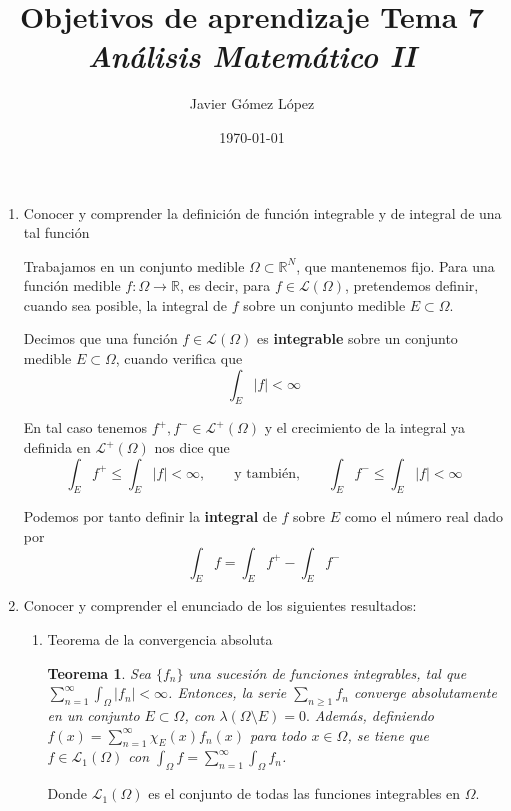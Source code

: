 \documentclass[a4paper, 12pt]{article}
\title{\textbf{Objetivos de aprendizaje Tema 7} \\ \textit{Análisis Matemático II}}
\author{Javier Gómez López}
\date{\today}
\newtheorem{teorema}{Teorema}
\begin{document}
\maketitle

\begin{enumerate}[label=\textbf{\arabic*}.]

\item Conocer y comprender la definición de función integrable y de integral de una tal función
	
Trabajamos en un conjunto medible \(\Omega \subset \mathbb{R}^N\), que mantenemos fijo. Para una función medible \(f: \Omega \to \mathbb{R}\), es decir, para \(f \in \mathcal{L} (\Omega)\), pretendemos definir, cuando sea posible, la integral de \(f\) sobre un conjunto medible \(E \subset \Omega\).

Decimos que una función \(f \in \mathcal{L} (\Omega)\) es \textbf{integrable} sobre un conjunto medible \(E \subset \Omega\), cuando verifica que
\[
	\int_E |f| < \infty
\]

En tal caso tenemos \(f^+, f^- \in \mathcal{L}^+ (\Omega)\) y el crecimiento de la integral ya definida en \(\mathcal{L}^+ (\Omega)\) nos dice que
\[
	\int_E f^+ \leq \int_E |f| < \infty, \qquad \text{y también,} \qquad \int_E f^- \leq \int_E |f| < \infty
\]

Podemos por tanto definir la \textbf{integral} de \(f\) sobre \(E\) como el número real dado por 
\[
	\int_E f = \int_E f^+ - \int_E f^-
\]

\medskip

\item Conocer y comprender el enunciado de los siguientes resultados:

\begin{enumerate}[label=\textit{\alph*})]
	\item Teorema de la convergencia absoluta
	
	\begin{teorema}
	Sea \(\{f_n\}\) una sucesión de funciones integrables, tal que \(\sum_{n=1}^{\infty} \int_{\Omega} |f_n| < \infty\). Entonces, la serie \(\sum_{n \geq 1} f_n\) converge absolutamente en un conjunto \(E \subset \Omega\), con \(\lambda (\Omega \setminus E) = 0.\) Además, definiendo \(f(x) = \sum_{n=1}^{\infty} \chi_E (x) f_n(x)\) para todo \(x \in \Omega\), se tiene que \(f \in \mathcal{L}_1 (\Omega)\) con \(\int_{\Omega} f = \sum_{n=1}^{\infty} \int_{\Omega} f_n\).
	\end{teorema}
	
	Donde \(\mathcal{L}_1(\Omega)\) es el conjunto de todas las funciones integrables en \(\Omega\).
	

\end{enumerate}
\end{enumerate}
\end{document}
